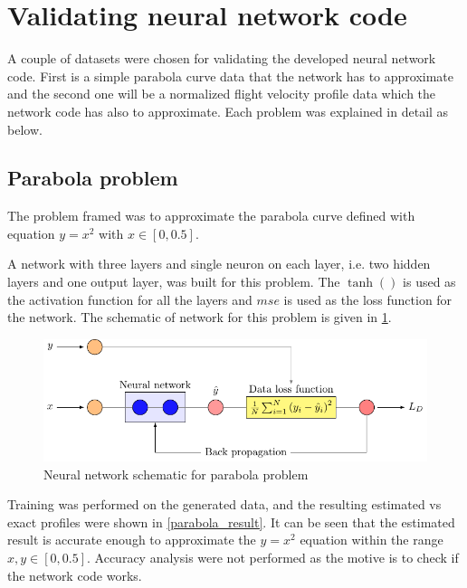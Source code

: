 \section{Validating neural network code}
\par{}
A couple of datasets were chosen for validating the developed neural network
code. First is a simple parabola curve data that the network has to approximate
and the second one will be a normalized flight velocity profile data which
the network code has also to approximate. Each problem was explained in detail
as below. \\

\subsection{Parabola problem}
\par{}
The problem framed was to approximate the parabola curve defined with equation
\(y = x^2\) with \(x \in [0,0.5]\).\\

\par{}
A network with three layers and single neuron on each layer, i.e. two hidden
layers and one output layer, was built for this problem. The \(\tanh()\) is
used as the activation function for all the layers and \(mse\) is used as the
loss function for the network. The schematic of network for this problem is
given in \cref{parabola_network_schematic}.\\

\begin{figure}
   \center
    \includegraphics[scale=1]{supportingFiles/01_schematics/02_parabola_network/parabola_network.pdf}
    \caption{Neural network schematic for parabola problem}
    \label{parabola_network_schematic}
\end{figure}

\par{}
Training was performed on the generated data, and the resulting estimated
vs exact profiles were shown in \cref{parabola_result}. It can be seen that the
estimated result is accurate enough to approximate the \(y=x^2\) equation
within the range \(x,y \in [0,0.5]\). Accuracy analysis were not performed as the
motive is to check if the network code works. \\


